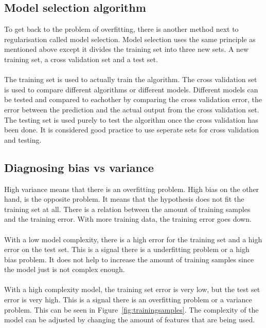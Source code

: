 \subsection{Model selection algorithm}
\label{modelselection}
To get back to the problem of overfitting, there is another method next to regularisation called model selection. Model selection uses the same principle as mentioned above except it divides the training set into three new sets. A new training set, a cross validation set and a test set. \\\\
The training set is used to actually train the algorithm. The cross validation set is used to compare different algorithms or different models. Different models can be tested and compared to eachother by comparing the cross validation error, the error between the prediction and the actual output from the cross validation set. The testing set is used purely to test the algorithm once the cross validation has been done. It is considered good practice to use seperate sets for cross validation and testing. \cite{wiki}

\subsection{Diagnosing bias vs variance}
\label{learningcurve}
High variance means that there is an overfitting problem. High bias on the other hand, is the opposite problem. It means that the hypothesis does not fit the training set at all. There is a relation between the amount of training samples and the training error. With more training data, the training error goes down. \\\\
With a low model complexity, there is a high error for the training set and a high error on the test set. This is a signal there is a underfitting problem or a high bias problem. It does not help to increase the amount of training samples since the model just is not complex enough. \\\\
With a high complexity model, the training set error is very low, but the test set error is very high. This is a signal there is an overfitting problem or a variance problem. This can be seen in Figure~\ref{fig:trainingsamples}. The complexity of the model can be adjusted by changing the amount of features that are being used. \cite{stanford}

